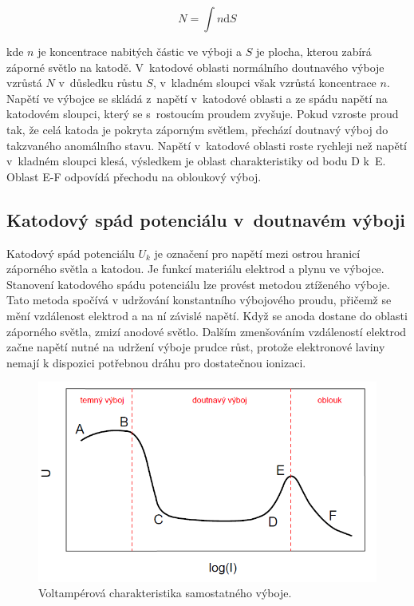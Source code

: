 \documentclass[a4paper,12pt]{article}
\begin{document}
\begin{equation}
	N = \int n \text{d}S
	\label{10}
\end{equation}

kde $n$ je koncentrace nabitých částic ve výboji a $S$ je plocha, kterou zabírá záporné světlo na katodě. V~katodové oblasti normálního doutnavého výboje vzrůstá $N$ v~důsledku růstu $S$, v~kladném sloupci však vzrůstá koncentrace $n$. Napětí ve výbojce se skládá z~napětí v~katodové oblasti a ze spádu napětí na katodovém sloupci, který se s~rostoucím proudem zvyšuje. Pokud vzroste proud tak, že celá katoda je pokryta záporným světlem, přechází doutnavý výboj do takzvaného anomálního stavu. Napětí v~katodové oblasti roste rychleji než napětí v~kladném sloupci klesá, výsledkem je oblast charakteristiky od bodu D k~E. Oblast E-F odpovídá přechodu na obloukový výboj.

\subsection{Katodový spád potenciálu v~doutnavém výboji}
Katodový spád potenciálu $U_k$ je označení pro napětí mezi ostrou hranicí záporného světla a katodou. Je funkcí materiálu elektrod a plynu ve výbojce. Stanovení katodového spádu potenciálu lze provést metodou ztíženého výboje. 
Tato metoda spočívá v udržování konstantního výbojového proudu, přičemž se mění vzdálenost elektrod a na ní závislé napětí. Když se anoda dostane do oblasti záporného světla, zmizí anodové 
světlo. Dalším zmenšováním vzdáleností elektrod začne napětí nutné na udržení výboje prudce růst, protože elektronové laviny nemají k dispozici potřebnou dráhu pro dostatečnou ionizaci.

\begin{figure}[h]
	\centering
	\includegraphics[width=130mm]{VA.png}
	\caption{Voltampérová charakteristika samostatného výboje.}
	\label{VA}
\end{figure}
\end{document}
